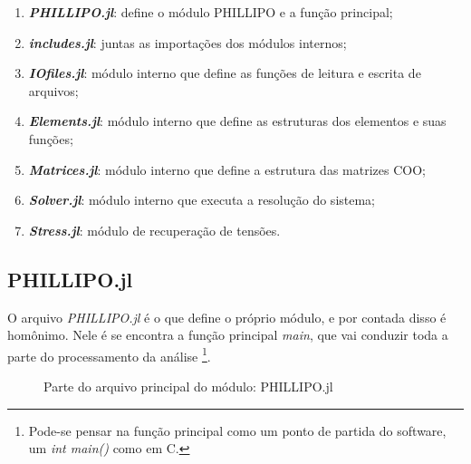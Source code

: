 \begin{enumerate}
    \item \textbf{\emph{PHILLIPO.jl}}: define o módulo PHILLIPO e a função principal;
    \item \textbf{\emph{includes.jl}}: juntas as importações dos módulos internos;
    \item \textbf{\emph{IOfiles.jl}}: módulo interno que define as funções de leitura e escrita de arquivos;
    \item \textbf{\emph{Elements.jl}}: módulo interno que  define as estruturas dos elementos e suas funções;
    \item \textbf{\emph{Matrices.jl}}: módulo interno que define a estrutura das matrizes COO;
    \item \textbf{\emph{Solver.jl}}: módulo interno que executa a resolução do sistema;
    \item \textbf{\emph{Stress.jl}}: módulo de recuperação de tensões.
\end{enumerate}


\subsection{PHILLIPO.jl}

O arquivo \emph{PHILLIPO.jl} é o que define o próprio módulo, e por contada disso é homônimo. Nele é se encontra a função principal \emph{main}, que vai conduzir toda a parte do processamento da análise \footnote{Pode-se pensar na função principal como um ponto de partida do software, um \emph{int main()} como em C.}. 

\begin{figure}[hbtp]
    \caption{Parte do arquivo principal do módulo: PHILLIPO.jl}
    
    \label{fig:phillipo.jl}
\end{figure}

